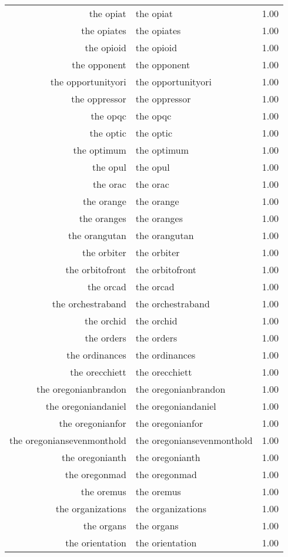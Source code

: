 \begin{table}[ht]
\begin{tabular}{rlr}
  the opiat & the opiat & 1.00 \\ 
  the opiates & the opiates & 1.00 \\ 
  the opioid & the opioid & 1.00 \\ 
  the opponent & the opponent & 1.00 \\ 
  the opportunityori & the opportunityori & 1.00 \\ 
  the oppressor & the oppressor & 1.00 \\ 
  the opqc & the opqc & 1.00 \\ 
  the optic & the optic & 1.00 \\ 
  the optimum & the optimum & 1.00 \\ 
  the opul & the opul & 1.00 \\ 
  the orac & the orac & 1.00 \\ 
  the orange & the orange & 1.00 \\ 
  the oranges & the oranges & 1.00 \\ 
  the orangutan & the orangutan & 1.00 \\ 
  the orbiter & the orbiter & 1.00 \\ 
  the orbitofront & the orbitofront & 1.00 \\ 
  the orcad & the orcad & 1.00 \\ 
  the orchestraband & the orchestraband & 1.00 \\ 
  the orchid & the orchid & 1.00 \\ 
  the orders & the orders & 1.00 \\ 
  the ordinances & the ordinances & 1.00 \\ 
  the orecchiett & the orecchiett & 1.00 \\ 
  the oregonianbrandon & the oregonianbrandon & 1.00 \\ 
  the oregoniandaniel & the oregoniandaniel & 1.00 \\ 
  the oregonianfor & the oregonianfor & 1.00 \\ 
  the oregoniansevenmonthold & the oregoniansevenmonthold & 1.00 \\ 
  the oregonianth & the oregonianth & 1.00 \\ 
  the oregonmad & the oregonmad & 1.00 \\ 
  the oremus & the oremus & 1.00 \\ 
  the organizations & the organizations & 1.00 \\ 
  the organs & the organs & 1.00 \\ 
  the orientation & the orientation & 1.00 \\ 

\end{tabular}
\end{table}

